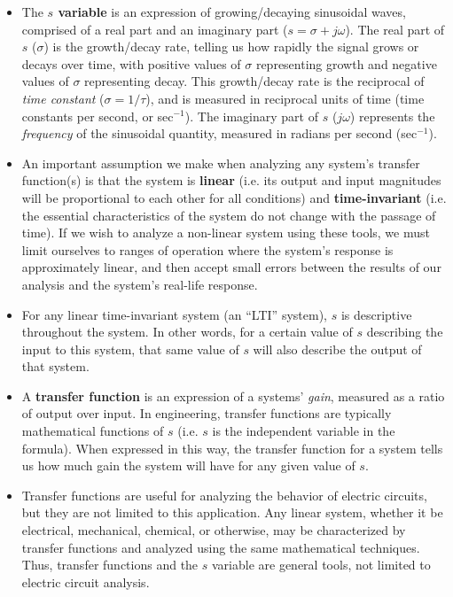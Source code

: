 \begin{itemize}
\item The \textbf{$s$ variable} is an expression of growing/decaying sinusoidal waves, comprised of a real part and an imaginary part ($s = \sigma + j \omega$).  The real part of $s$ ($\sigma$) is the growth/decay rate, telling us how rapidly the signal grows or decays over time, with positive values of $\sigma$ representing growth and negative values of $\sigma$ representing decay.  This growth/decay rate is the reciprocal of \textit{time constant} ($\sigma = 1 / \tau$), and is measured in reciprocal units of time (time constants per second, or sec$^{-1}$).  The imaginary part of $s$ ($j \omega$) represents the \textit{frequency} of the sinusoidal quantity, measured in radians per second (sec$^{-1}$).  
\vskip 10pt
\item An important assumption we make when analyzing any system's transfer function(s) is that the system is \textbf{linear} (i.e. its output and input magnitudes will be proportional to each other for all conditions) and \textbf{time-invariant} (i.e. the essential characteristics of the system do not change with the passage of time).  If we wish to analyze a non-linear system using these tools, we must limit ourselves to ranges of operation where the system's response is approximately linear, and then accept small errors between the results of our analysis and the system's real-life response.
\vskip 10pt
\item For any linear time-invariant system (an ``LTI'' system), $s$ is descriptive throughout the system.  In other words, for a certain value of $s$ describing the input to this system, that same value of $s$ will also describe the output of that system.    
\vskip 10pt
\item A \textbf{transfer function} is an expression of a systems' \textit{gain}, measured as a ratio of output over input.  In engineering, transfer functions are typically mathematical functions of $s$ (i.e. $s$ is the independent variable in the formula).  When expressed in this way, the transfer function for a system tells us how much gain the system will have for any given value of $s$.  
\vskip 10pt
\item Transfer functions are useful for analyzing the behavior of electric circuits, but they are not limited to this application.  Any linear system, whether it be electrical, mechanical, chemical, or otherwise, may be characterized by transfer functions and analyzed using the same mathematical techniques.  Thus, transfer functions and the $s$ variable are general tools, not limited to electric circuit analysis.

\end{itemize}
